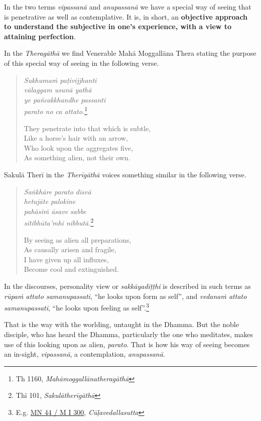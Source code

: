 In the two terms \emph{vipassanā} and \emph{anupassanā} we have a special way of seeing that is penetrative as well as contemplative. It is, in short, an \textbf{objective approach to understand the subjective in one's experience, with a view to attaining perfection}.

In the \emph{Theragāthā} we find Venerable Mahā Moggallāna Thera stating the purpose of this special way of seeing in the following verse.

\begin{quote}
\emph{Sukhumaṁ paṭivijjhanti}\\
\emph{vālaggam usunā yathā}\\
\emph{ye pañcakkhandhe passanti}\\
\emph{parato no ca attato.}\footnote{Th 1160, \emph{Mahāmoggallānatheragāthā}}

They penetrate into that which is subtle,\\
Like a horse's hair with an arrow,\\
Who look upon the aggregates five,\\
As something alien, not their own.
\end{quote}

Sakulā Therī in the \emph{Therīgāthā} voices something similar in the following verse.

\begin{quote}
\emph{Saṅkhāre parato disvā}\\
\emph{hetujāte palokine}\\
\emph{pahāsiṁ āsave sabbe}\\
\emph{sītibhūta'mhi nibbutā.}\footnote{Thī 101, \emph{Sakulātherīgāthā}}

By seeing as alien all preparations,\\
As causally arisen and fragile,\\
I have given up all influxes,\\
Become cool and extinguished.
\end{quote}

In the discourses, personality view or \emph{sakkāyadiṭṭhi} is described in such terms as \emph{rūpaṁ attato samanupassati}, ``he looks upon form as self'', and \emph{vedanaṁ attato samanupassati}, ``he looks upon feeling as self''.\footnote{E.g. \href{https://suttacentral.net/mn44/pli/ms}{MN 44 / M I 300}, \emph{Cūḷavedallasutta}}

That is the way with the worlding, untaught in the Dhamma. But the noble disciple, who has heard the Dhamma, particularly the one who meditates, makes use of this looking upon as alien, \emph{parato}. That is how his way of seeing becomes an in-sight, \emph{vipassanā}, a contemplation, \emph{anupassanā}.

